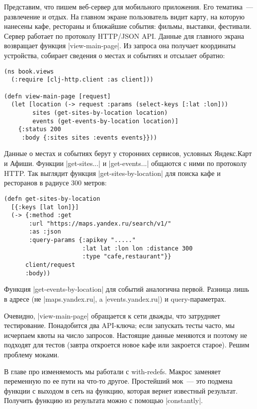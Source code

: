 Представим, что пишем веб-сервер для мобильного приложения. Его тематика~---
развлечение и отдых. На главном экране пользователь видит карту, на которую
нанесены кафе, рестораны и ближайшие события: фильмы, выставки,
фестивали. Сервер работает по протоколу HTTP/JSON API. Данные для главного
экрана возвращает функция \spverb|view-main-page|. Из запроса она получает
координаты устройства, собирает сведения о местах и событиях и отсылает обратно:

\begin{verbatim}
(ns book.views
  (:require [clj-http.client :as client]))

(defn view-main-page [request]
  (let [location (-> request :params (select-keys [:lat :lon]))
        sites (get-sites-by-location location)
        events (get-events-by-location location)]
    {:status 200
     :body {:sites sites :events events}}))
\end{verbatim}


Данные о местах и событиях берут у сторонних сервисов, условных Яндекс.Карт и
Афиши. Функции \spverb|get-sites...| и \spverb|get-events...| общаются с ними по
протоколу HTTP. Так выглядит функция \spverb|get-sites-by-location| для поиска
кафе и ресторанов в радиусе 300 метров:

\begin{verbatim}
(defn get-sites-by-location
  [{:keys [lat lon]}]
  (-> {:method :get
       :url "https://maps.yandex.ru/search/v1/"
       :as :json
       :query-params {:apikey "....."
                      :lat lat :lon lon :distance 300
                      :type "cafe,restaurant"}}
      client/request
      :body))
\end{verbatim}

Функция \spverb|get-events-by-location| для событий аналогична первой. Разница
лишь в адресе (не \spverb|maps.yandex.ru|, a \spverb|events.yandex.ru|) и
query-параметрах.

Очевидно, \spverb|view-main-page| обращается к сети дважды, что затрудняет
тестирование. Понадобится два API-ключа; если запускать тесты часто, мы
исчерпаем квоты на число запросов. Настоящие данные меняются и поэтому не
подходят для тестов (завтра откроется новое кафе или закроется старое). Решим
проблему моками.


В главе про изменяемость мы работали с with-redefs. Макрос заменяет переменную
по ее пути на что-то другое. Простейший мок~--- это подмена функции с выходом в
сеть на функцию, которая вернет известный результат. Получить функцию из
результата можно с помощью \spverb|constantly|.

